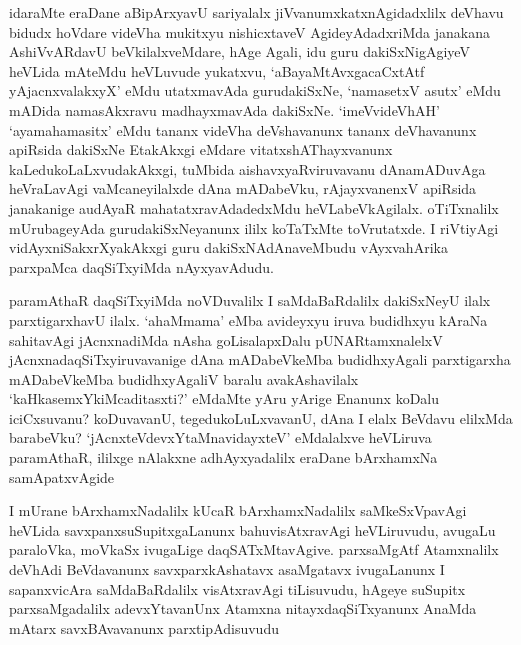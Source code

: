 \begin{artha}
idaraMte eraDane aBipArxyavU sariyalalx jiVvanumxkatxnAgidadxlilx deVhavu bidudx hoVdare videVha mukitxyu nishicxtaveV AgideyAdadxriMda janakana AshiVvARdavU beVkilalxveMdare, hAge Agali, idu guru dakiSxNigAgiyeV heVLida mAteMdu heVLuvude yukatxvu, `aBayaMtAvxgacaCxtAtf yAjacnxvalakxyX' eMdu utatxmavAda gurudakiSxNe, `namasetxV asutx' eMdu mADida namasAkxravu madhayxmavAda dakiSxNe. `imeVvideVhAH' `ayamahamasitx' eMdu tananx videVha deVshavanunx tananx deVhavanunx apiRsida dakiSxNe EtakAkxgi eMdare vitatxshAThayxvanunx kaLedukoLaLxvudakAkxgi, tuMbida aishavxyaRviruvavanu dAnamADuvAga heVraLavAgi vaMcaneyilalxde dAna mADabeVku, rAjayxvanenxV apiRsida janakanige audAyaR mahatatxravAdadedxMdu heVLabeVkAgilalx. oTiTxnalilx mUrubageyAda gurudakiSxNeyanunx ililx koTaTxMte toVrutatxde. I riVtiyAgi vidAyxniSakxrXyakAkxgi guru dakiSxNAdAnaveMbudu vAyxvahArika parxpaMca daqSiTxyiMda nAyxyavAdudu. 
\end{artha}


\begin{artha}
paramAthaR daqSiTxyiMda noVDuvalilx I saMdaBaRdalilx dakiSxNeyU ilalx parxtigarxhavU ilalx. `ahaMmama' eMba avideyxyu iruva budidhxyu kAraNa sahitavAgi jAcnxnadiMda nAsha goLisalapxDalu pUNARtamxnalelxV jAcnxnadaqSiTxyiruvavanige dAna mADabeVkeMba budidhxyAgali parxtigarxha mADabeVkeMba budidhxyAgaliV baralu avakAshavilalx `kaHkasemxYkiMcaditasxti?' eMdaMte yAru yArige Enanunx koDalu iciCxsuvanu? koDuvavanU, tegedukoLuLxvavanU, dAna I elalx BeVdavu elilxMda barabeVku? `jAcnxteVdevxYtaMnavidayxteV' eMdalalxve heVLiruva paramAthaR, ililxge nAlakxne adhAyxyadalilx eraDane bArxhamxNa samApatxvAgide
\end{artha}



\begin{artha}
I mUrane bArxhamxNadalilx kUcaR bArxhamxNadalilx saMkeSxVpavAgi heVLida savxpanxsuSupitxgaLanunx bahuvisAtxravAgi heVLiruvudu, avugaLu paraloVka, moVkaSx ivugaLige daqSATxMtavAgive. parxsaMgAtf Atamxnalilx deVhAdi BeVdavanunx savxparxkAshatavx asaMgatavx ivugaLanunx I sapanxvicAra saMdaBaRdalilx visAtxravAgi tiLisuvudu, hAgeye suSupitx parxsaMgadalilx adevxYtavanUnx Atamxna nitayxdaqSiTxyanunx AnaMda mAtarx savxBAvavanunx parxtipAdisuvudu
\end{artha}

